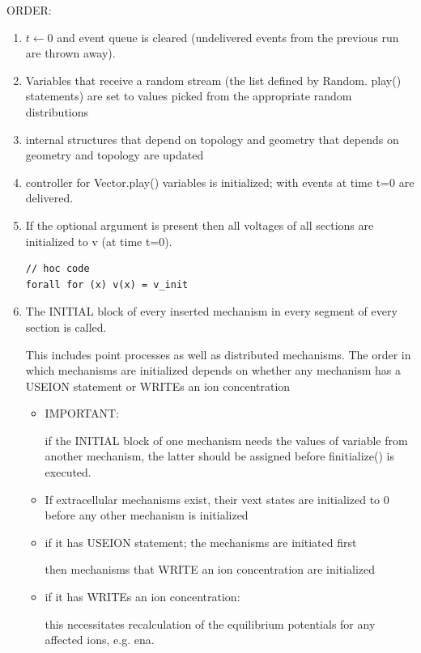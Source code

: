 ORDER:
\begin{enumerate}
  \item $t \leftarrow 0$ and event queue is cleared (undelivered events from the
previous run are thrown away).

  \item Variables that receive a random stream (the list defined by Random.
play() statements) are set to values picked from the appropriate
random distributions

  \item internal structures that depend on topology and geometry that depends on
  geometry and topology are updated
  
  \item controller for Vector.play() variables is initialized; with 
  events at time t=0 are
delivered.

  \item  If the optional argument is present then all voltages of all sections are
initialized to v (at time t=0).
\begin{verbatim}
// hoc code
forall for (x) v(x) = v_init
\end{verbatim}
  
  \item The INITIAL block of every inserted mechanism in every segment of
every section is called.

This includes point processes as well as
distributed mechanisms. The order
in which mechanisms are initialized depends on whether any
mechanism has a USEION statement or WRITEs an ion concentration
\begin{itemize}
  \item IMPORTANT:
  
if the INITIAL block of one mechanism needs the values of variable from another
mechanism, the latter should be assigned before finitialize() is executed.

  \item If extracellular mechanisms exist, their vext states are initialized to 0
before any other mechanism is initialized

  \item if it has USEION statement; the mechanisms are initiated first
  
  then mechanisms that WRITE an ion concentration are initialized
  
  \item if it has WRITEs an ion concentration:
  
  this necessitates recalculation of the equilibrium potentials for any affected
  ions, e.g. ena. 


\end{itemize}
\end{enumerate}
